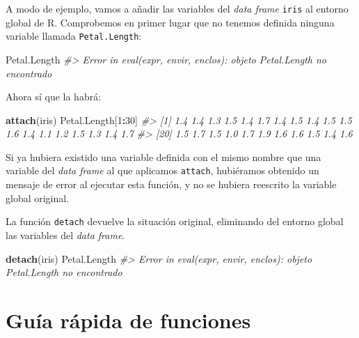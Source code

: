 \documentclass[
]{book}
\newenvironment{Shaded}{\begin{snugshade}}{\end{snugshade}}
\newcommand{\CommentTok}[1]{\textcolor[rgb]{0.56,0.35,0.01}{\textit{#1}}}
\newcommand{\DecValTok}[1]{\textcolor[rgb]{0.00,0.00,0.81}{#1}}
\newcommand{\KeywordTok}[1]{\textcolor[rgb]{0.13,0.29,0.53}{\textbf{#1}}}
\newcommand{\NormalTok}[1]{#1}
\newcommand{\OperatorTok}[1]{\textcolor[rgb]{0.81,0.36,0.00}{\textbf{#1}}}
\theoremstyle{definition}
\theoremstyle{definition}
\theoremstyle{definition}
\theoremstyle{remark}
\begin{document}
A modo de ejemplo, vamos a añadir las variables del \emph{data frame} \texttt{iris} al entorno global de R. Comprobemos en primer lugar que no tenemos definida ninguna variable llamada \texttt{Petal.Length}:

\begin{Shaded}
\begin{Highlighting}[]
\NormalTok{Petal.Length}
\CommentTok{\#\textgreater{} Error in eval(expr, envir, enclos): objeto \textquotesingle{}Petal.Length\textquotesingle{} no encontrado}
\end{Highlighting}
\end{Shaded}

Ahora sí que la habrá:

\begin{Shaded}
\begin{Highlighting}[]
\KeywordTok{attach}\NormalTok{(iris)}
\NormalTok{Petal.Length[}\DecValTok{1}\OperatorTok{:}\DecValTok{30}\NormalTok{]}
\CommentTok{\#\textgreater{}  [1] 1.4 1.4 1.3 1.5 1.4 1.7 1.4 1.5 1.4 1.5 1.5 1.6 1.4 1.1 1.2 1.5 1.3 1.4 1.7}
\CommentTok{\#\textgreater{} [20] 1.5 1.7 1.5 1.0 1.7 1.9 1.6 1.6 1.5 1.4 1.6}
\end{Highlighting}
\end{Shaded}

Si ya hubiera existido una variable definida con el mismo nombre que una variable del \emph{data frame} al que aplicamos \texttt{attach}, hubiéramos obtenido un mensaje de error al ejecutar esta función, y no se hubiera reescrito la variable global original.

La función \texttt{detach} devuelve la situación original, eliminando del entorno global las variables del \emph{data frame}.

\begin{Shaded}
\begin{Highlighting}[]
\KeywordTok{detach}\NormalTok{(iris)}
\NormalTok{Petal.Length}
\CommentTok{\#\textgreater{} Error in eval(expr, envir, enclos): objeto \textquotesingle{}Petal.Length\textquotesingle{} no encontrado}
\end{Highlighting}
\end{Shaded}

\hypertarget{guuxeda-ruxe1pida-de-funciones-2}{%
\section{Guía rápida de funciones}\label{guuxeda-ruxe1pida-de-funciones-2}}
\end{document}
